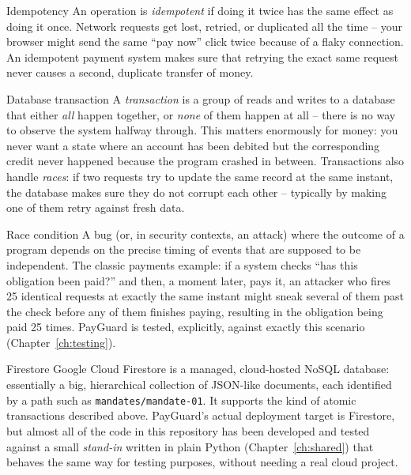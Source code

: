 \documentclass[11pt]{report}
\newcommand{\code}[1]{\texttt{#1}}
\begin{document}
\begin{concept}{Idempotency}
An operation is \emph{idempotent} if doing it twice has the same effect
as doing it once. Network requests get lost, retried, or duplicated all
the time -- your browser might send the same ``pay now'' click twice
because of a flaky connection. An idempotent payment system makes sure
that retrying the exact same request never causes a second, duplicate
transfer of money.
\end{concept}

\begin{concept}{Database transaction}
A \emph{transaction} is a group of reads and writes to a database that
either \emph{all} happen together, or \emph{none} of them happen at all
-- there is no way to observe the system halfway through. This matters
enormously for money: you never want a state where an account has been
debited but the corresponding credit never happened because the program
crashed in between. Transactions also handle \emph{races}: if two
requests try to update the same record at the same instant, the database
makes sure they do not corrupt each other -- typically by making one of
them retry against fresh data.
\end{concept}

\begin{concept}{Race condition}
A bug (or, in security contexts, an attack) where the outcome of a
program depends on the precise timing of events that are supposed to be
independent. The classic payments example: if a system checks ``has this
obligation been paid?'' and then, a moment later, pays it, an attacker
who fires 25 identical requests at exactly the same instant might sneak
several of them past the check before any of them finishes paying,
resulting in the obligation being paid 25 times. PayGuard is tested,
explicitly, against exactly this scenario (Chapter~\ref{ch:testing}).
\end{concept}

\begin{concept}{Firestore}
Google Cloud Firestore is a managed, cloud-hosted NoSQL database:
essentially a big, hierarchical collection of JSON-like documents, each
identified by a path such as \code{mandates/mandate-01}. It supports the
kind of atomic transactions described above. PayGuard's actual deployment
target is Firestore, but almost all of the code in this repository has
been developed and tested against a small \emph{stand-in} written in
plain Python (Chapter~\ref{ch:shared}) that behaves the same way for
testing purposes, without needing a real cloud project.
\end{concept}
\end{document}
